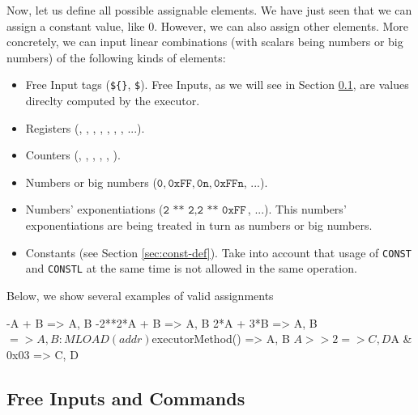 Now, let us define all possible assignable elements. We have just seen that we can assign a constant value, like $0$. However, we can also assign other elements. More concretely, we can input linear combinations (with scalars being numbers or big numbers) of the following kinds of elements:

\begin{itemize}

\item Free Input tags (\texttt{\$\{\}}, \texttt{\$}). Free Inputs, as we will see in Section \ref{sec:free-inputs}, are values direclty computed by the executor.

\item Registers (\A, \B, \C, \D, \E, \SP, \RR, ...).

\item Counters (\CNTARITH, \CNTBINARY, \CNTKECCAKF, \CNTMEMALIGN, \CNTPADDINGPG, \CNTPOSEIDONG). 

\item Numbers or big numbers ($\texttt{0}, \texttt{0xFF}, \texttt{0n}, \texttt{0xFFn}$, ...). 

\item Numbers' exponentiations ($\texttt{2 ** 2}, \texttt{2 ** 0xFF}$, ...). This numbers' exponentiations are being treated in turn as numbers or big numbers. 

\item Constants (see Section \ref{sec:const-def}). Take into account that usage of \texttt{CONST} and \texttt{CONSTL} at the same time is not allowed in the same operation.


\end{itemize}

Below, we show several examples of valid assignments

\begin{zkasm}
-A + B => A, B
-2**2*A + B => A, B
2*A + 3*B => A, B
$ => A, B				:MLOAD(addr)
${executorMethod()} => A, B
${A >> 2} => C, D
${A & 0x03} => C, D
\end{zkasm}








\subsection{Free Inputs and Commands} \label{sec:free-inputs}

